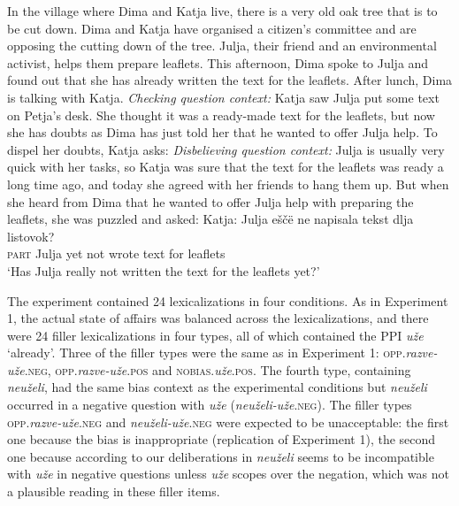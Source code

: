 \documentclass[output=paper,colorlinks,citecolor=brown]{langscibook}
\begin{document}
\begin{exe}
\ex \label{ex:05:14} In the village where Dima and Katja live, there is a very old oak tree that is to be cut down. Dima and Katja have organised a citizen's committee and are opposing the cutting down of the tree. Julja, their friend and an environmental activist, helps them prepare leaflets. This afternoon, Dima spoke to Julja and found out that she has already written the text for the leaflets. After lunch, Dima is talking with Katja.
\sn \textit{Checking question context:} Katja saw Julja put some text on Petja's desk. She thought it was a ready-made text for the leaflets, but now she has doubts as Dima has just told her that he wanted to offer Julja help. To dispel her doubts, Katja asks:
\sn \textit{Disbelieving question context:} Julja is usually very quick with her tasks, so Katja was sure that the text for the leaflets was ready a long time ago, and today she agreed with her friends to hang them up. But when she heard from Dima that he wanted to offer Julja help with preparing the leaflets, she was puzzled and asked:
\sn Katja:  Julja eščë ne napisala tekst dlja listovok?\\
\textsc{part} Julja yet not wrote text for leaflets\\
\glt \phantom{Katja:} `Has Julja really not written the text for the leaflets yet?'
\end{exe}

The experiment contained 24 lexicalizations in four conditions. As in Experiment 1, the actual state of affairs was balanced across the lexicalizations, and there were 24 filler lexicalizations in four types, all of which contained the PPI \textit{uže} `already'. Three of the filler types were the same as in Experiment 1: \textsc{opp.}\textit{razve-uže}\textsc{.neg}, \textsc{opp.}\textit{razve-uže}\textsc{.pos} and \textsc{nobias.}\textit{uže}\textsc{.pos}. The fourth type, containing \textit{n\-eu\-že\-li}, had the same bias context as the experimental conditions but \textit{neuželi} occurred in a negative question with \textit{uže} (\textit{neuželi-uže}\textsc{.neg}). The filler types \textsc{opp.}\textit{raz\-ve}\textit{-uže}\textsc{.neg} and \textit{neuželi-uže}\textsc{.neg} were expected to be unacceptable: the first one because the bias is inappropriate (replication of Experiment 1), the second one because according to our deliberations in  \textit{neuželi} seems to be incompatible with \textit{uže} in negative questions unless \textit{uže} scopes over the negation, which was not a plausible reading in these filler items.
\end{document}
